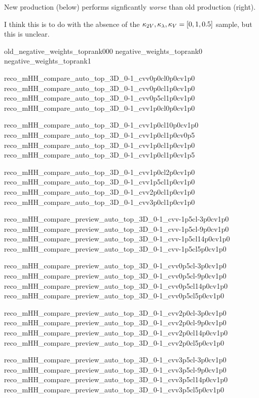 { \tiny
    New production (below) performs signficantly \textit{worse} than old production (right).
    \vspace{3mm}

    I think this is to do with the absence of the $\kappa_{2V},\kappa_{\lambda},\kappa_{V} = [0, 1, 0.5]$ sample, but this is unclear.
}
{old_negative_weights_toprank000}
{negative_weights_toprank0}
{negative_weights_toprank1}

{reco_mHH_compare_auto_top_3D_0-1_cvv0p0cl0p0cv1p0}
{reco_mHH_compare_auto_top_3D_0-1_cvv0p0cl1p0cv1p0}
{reco_mHH_compare_auto_top_3D_0-1_cvv0p5cl1p0cv1p0}
{reco_mHH_compare_auto_top_3D_0-1_cvv1p0cl0p0cv1p0}

{reco_mHH_compare_auto_top_3D_0-1_cvv1p0cl10p0cv1p0}
{reco_mHH_compare_auto_top_3D_0-1_cvv1p0cl1p0cv0p5}
{reco_mHH_compare_auto_top_3D_0-1_cvv1p0cl1p0cv1p0}
{reco_mHH_compare_auto_top_3D_0-1_cvv1p0cl1p0cv1p5}

{reco_mHH_compare_auto_top_3D_0-1_cvv1p0cl2p0cv1p0}
{reco_mHH_compare_auto_top_3D_0-1_cvv1p5cl1p0cv1p0}
{reco_mHH_compare_auto_top_3D_0-1_cvv2p0cl1p0cv1p0}
{reco_mHH_compare_auto_top_3D_0-1_cvv3p0cl1p0cv1p0}



{reco_mHH_compare_preview_auto_top_3D_0-1_cvv-1p5cl-3p0cv1p0}
{reco_mHH_compare_preview_auto_top_3D_0-1_cvv-1p5cl-9p0cv1p0}
{reco_mHH_compare_preview_auto_top_3D_0-1_cvv-1p5cl14p0cv1p0}
{reco_mHH_compare_preview_auto_top_3D_0-1_cvv-1p5cl5p0cv1p0}

{reco_mHH_compare_preview_auto_top_3D_0-1_cvv0p5cl-3p0cv1p0}
{reco_mHH_compare_preview_auto_top_3D_0-1_cvv0p5cl-9p0cv1p0}
{reco_mHH_compare_preview_auto_top_3D_0-1_cvv0p5cl14p0cv1p0}
{reco_mHH_compare_preview_auto_top_3D_0-1_cvv0p5cl5p0cv1p0}

{reco_mHH_compare_preview_auto_top_3D_0-1_cvv2p0cl-3p0cv1p0}
{reco_mHH_compare_preview_auto_top_3D_0-1_cvv2p0cl-9p0cv1p0}
{reco_mHH_compare_preview_auto_top_3D_0-1_cvv2p0cl14p0cv1p0}
{reco_mHH_compare_preview_auto_top_3D_0-1_cvv2p0cl5p0cv1p0}

{reco_mHH_compare_preview_auto_top_3D_0-1_cvv3p5cl-3p0cv1p0}
{reco_mHH_compare_preview_auto_top_3D_0-1_cvv3p5cl-9p0cv1p0}
{reco_mHH_compare_preview_auto_top_3D_0-1_cvv3p5cl14p0cv1p0}
{reco_mHH_compare_preview_auto_top_3D_0-1_cvv3p5cl5p0cv1p0}
